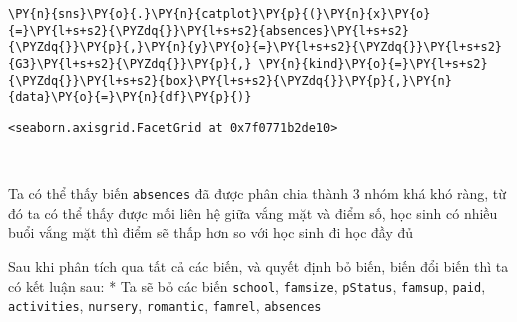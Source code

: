     \begin{tcolorbox}[breakable, size=fbox, boxrule=1pt, pad at break*=1mm,colback=cellbackground, colframe=cellborder]
\begin{Verbatim}[commandchars=\\\{\}]
\PY{n}{sns}\PY{o}{.}\PY{n}{catplot}\PY{p}{(}\PY{n}{x}\PY{o}{=}\PY{l+s+s2}{\PYZdq{}}\PY{l+s+s2}{absences}\PY{l+s+s2}{\PYZdq{}}\PY{p}{,}\PY{n}{y}\PY{o}{=}\PY{l+s+s2}{\PYZdq{}}\PY{l+s+s2}{G3}\PY{l+s+s2}{\PYZdq{}}\PY{p}{,} \PY{n}{kind}\PY{o}{=}\PY{l+s+s2}{\PYZdq{}}\PY{l+s+s2}{box}\PY{l+s+s2}{\PYZdq{}}\PY{p}{,}\PY{n}{data}\PY{o}{=}\PY{n}{df}\PY{p}{)}
\end{Verbatim}
\end{tcolorbox}

            \begin{tcolorbox}[breakable, size=fbox, boxrule=.5pt, pad at break*=1mm, opacityfill=0]
\begin{Verbatim}[commandchars=\\\{\}]
<seaborn.axisgrid.FacetGrid at 0x7f0771b2de10>
\end{Verbatim}
\end{tcolorbox}
        
    \begin{center}
    \end{center}
    { \hspace*{\fill} \\}
    
    Ta có thể thấy biến \texttt{absences} đã được phân chia thành 3 nhóm khá
khó ràng, từ đó ta có thể thấy được mối liên hệ giữa vắng mặt và điểm
số, học sinh có nhiều buổi vắng mặt thì điểm sẽ thấp hơn so với học sinh
đi học đầy đủ

    Sau khi phân tích qua tất cả các biến, và quyết định bỏ biến, biến đổi
biến thì ta có kết luận sau: * Ta sẽ bỏ các biến \texttt{school},
\texttt{famsize}, \texttt{pStatus}, \texttt{famsup}, \texttt{paid},
\texttt{activities}, \texttt{nursery}, \texttt{romantic},
\texttt{famrel}, \texttt{absences}


